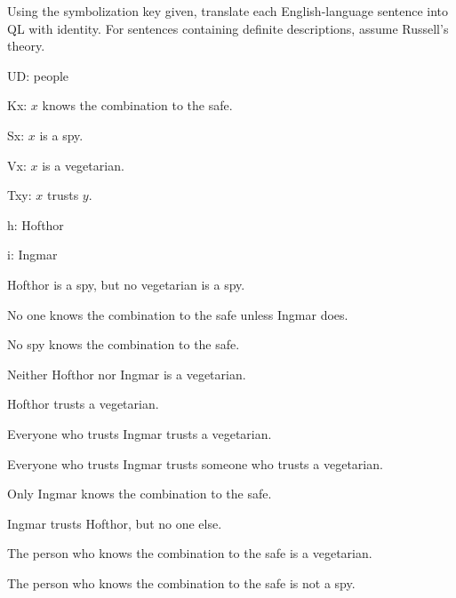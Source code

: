 \solutions
\problempart
\label{pr.QL-ID-spies}
Using the symbolization key given, translate each English-language sentence into QL with identity. For sentences containing definite descriptions, assume Russell's theory.
\begin{ekey}
\item[UD:] people
\item[Kx:] $x$ knows the combination to the safe.
\item[Sx:] $x$ is a spy.
\item[Vx:] $x$ is a vegetarian.
\item[Txy:] $x$ trusts $y$.
\item[h:] Hofthor
\item[i:] Ingmar
\end{ekey}
\begin{earg}
\item Hofthor is a spy, but no vegetarian is a spy.
\item No one knows the combination to the safe unless Ingmar does.
\item No spy knows the combination to the safe.
\item Neither Hofthor nor Ingmar is a vegetarian.
\item Hofthor trusts a vegetarian.
\item Everyone who trusts Ingmar trusts a vegetarian.
\item Everyone who trusts Ingmar trusts someone who trusts a vegetarian.
\item Only Ingmar knows the combination to the safe.
\item Ingmar trusts Hofthor, but no one else.
\item The person who knows the combination to the safe is a vegetarian.
\item The person who knows the combination to the safe is not a spy.
\end{earg}

